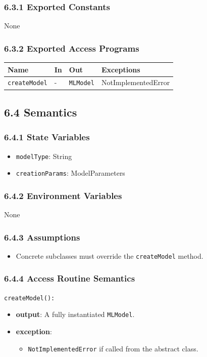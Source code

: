 \documentclass[12pt, titlepage]{article}
\begin{document}
\subsubsection{6.3.1 Exported Constants}
None

\subsubsection{6.3.2 Exported Access Programs}
\begin{center}
\begin{tabular}{p{4cm} p{3cm} p{4cm} p{3cm}}
\hline
\textbf{Name} & \textbf{In} & \textbf{Out} & \textbf{Exceptions} \\
\hline
\texttt{createModel} & - & \texttt{MLModel} & NotImplementedError \\
\hline
\end{tabular}
\end{center}

\subsection{6.4 Semantics}

\subsubsection{6.4.1 State Variables}
\begin{itemize}
    \item \texttt{modelType}: String
    \item \texttt{creationParams}: ModelParameters
\end{itemize}

\subsubsection{6.4.2 Environment Variables}
None

\subsubsection{6.4.3 Assumptions}
\begin{itemize}
    \item Concrete subclasses must override the \texttt{createModel} method.
\end{itemize}

\subsubsection{6.4.4 Access Routine Semantics}
\noindent \texttt{createModel():}
\begin{itemize}
    \item \textbf{output}: A fully instantiated \texttt{MLModel}.
    \item \textbf{exception}:
    \begin{itemize}
        \item \texttt{NotImplementedError} if called from the abstract class.
    \end{itemize}
\end{itemize}
\end{document}
